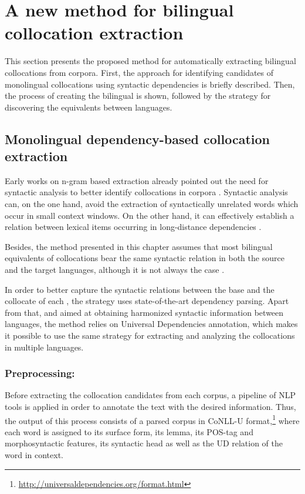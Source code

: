 \documentclass[output=paper,modfonts,nonflat]{langsci/langscibook}
\begin{document}
%
\section{A new method for bilingual collocation extraction}
\label{garcia:sec:method}
This section presents the proposed method for automatically extracting bilingual collocations from corpora.
First, the approach for identifying candidates of monolingual collocations using syntactic dependencies
is briefly described. Then, the process of creating the bilingual  is shown,
followed by the strategy for discovering the  equivalents between languages.

%
\subsection{Monolingual dependency-based collocation extraction}
\label{garcia:sec:monolingual}
Early works on n-gram based  extraction already pointed out the
need for syntactic analysis to better identify collocations in corpora
\citep{smadja1993,lin1999}. Syntactic analysis can, on the one hand, avoid the
extraction of syntactically unrelated words which occur in small context
windows. On the other hand, it can effectively establish a relation
between lexical items occurring in long-distance dependencies \citep{evert2008}.

Besides, the method presented
in this chapter assumes that most bilingual equivalents of collocations bear the same syntactic
relation in both the source and the target languages, although it is not always the case \citep{lu2004}.

In order to better capture the syntactic relations between the base and
the collocate of each , the strategy uses state-of-the-art dependency
parsing. Apart from that, and aimed at obtaining harmonized syntactic information
between languages, the method relies on Universal Dependencies annotation,
which makes it possible to use the same strategy for extracting and analyzing the collocations in multiple
languages.%

\subsubsection{Preprocessing:} Before extracting the collocation candidates from each
corpus, a pipeline of NLP tools is applied in order to annotate the text with the
desired information. Thus, the output of this process consists of a parsed corpus
in CoNLL-U format,\footnote{\scriptsize{\url{http://universaldependencies.org/format.html}}} where each word is assigned to its surface form, its lemma, its
POS-tag and morphosyntactic features, its syntactic head as well as the UD
relation of the word in context.
\end{document}
